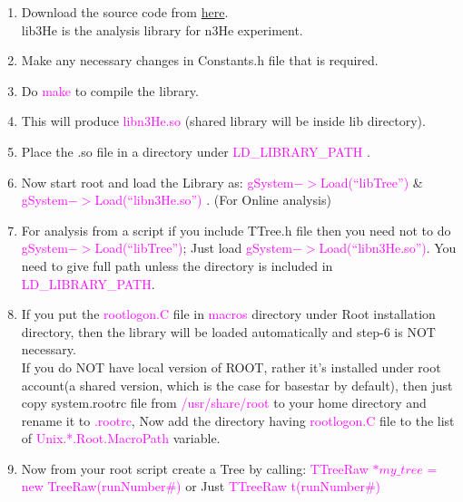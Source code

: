 \documentclass[12pt]{article}
\begin{document}
\begin{enumerate}
\item Download the source code from \href{http://latifkabir.github.io/n3He_Soft/}{here}. \\
lib3He is the analysis library for n3He experiment.

\item Make any necessary changes in Constants.h file that is required.

\item Do \textcolor{magenta}{ make} to compile the library. 

\item This will produce  \textcolor{magenta}{libn3He.so} (shared library will be inside lib directory).

\item Place the .so file in a directory under \textcolor{magenta}{ LD\_LIBRARY\_PATH }.

\item Now start root and load the Library as: \textcolor{magenta}{gSystem$->$Load(``libTree'')}  \& \textcolor{magenta}{gSystem$->$Load(``libn3He.so'')}  . (For Online analysis)

\item  For analysis from a script if you include TTree.h file then you need not to do \textcolor{magenta}{gSystem$->$Load(``libTree'')}; Just load 
    \textcolor{magenta}{gSystem$->$Load(``libn3He.so'')}.  You need to give full path unless the directory is included in \textcolor{magenta}{LD\_LIBRARY\_PATH}.

\item If you put the \textcolor{magenta}{rootlogon.C} file in \textcolor{magenta}{ macros } directory under Root installation directory, then the library will be loaded automatically and step-6 is NOT necessary.\\
If you do NOT have local version of ROOT, rather it's installed under root account(a shared version, which is the case for basestar by default), then just copy system.rootrc file from \textcolor{magenta}{/usr/share/root} to your home directory and rename it to \textcolor{magenta}{.rootrc}, Now add the directory having \textcolor{magenta}{rootlogon.C} file to the list of \textcolor{magenta}{Unix.*.Root.MacroPath} variable. \\
\item Now from your root script create a Tree by calling: \textcolor{magenta}{TTreeRaw ${\ast}my\_tree$ = new TreeRaw(runNumber\#)} or Just \textcolor{magenta}{TTreeRaw t(runNumber\#)}


\end{enumerate}
\end{document}
